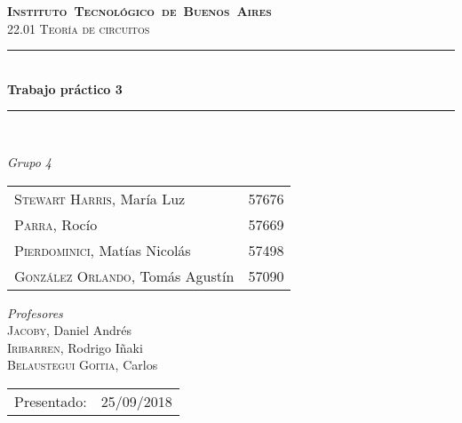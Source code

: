 \begin{titlepage}
\newcommand{\HRule}{\rule{\linewidth}{0.5mm}}
\center
\mbox{\textsc{\LARGE \bfseries {Instituto Tecnol\'ogico de Buenos Aires}}}\\[1.5cm]
\textsc{\Large 22.01 Teor\'ia de circuitos}\\[0.5cm]


\HRule \\[0.6cm]
{ \Huge \bfseries Trabajo pr\'actico 3}\\[0.4cm] %
\HRule \\[1.5cm]


{\large

\emph{Grupo 4}\\
\vspace{3px}

\begin{tabular}{lr} 	
\textsc{Stewart Harris}, Mar\'ia Luz  & 57676 \\ 	
\textsc{Parra}, Roc\'io  & 57669 \\ 	
\textsc{Pierdominici}, Mat\'ias Nicol\'as & 57498 \\     
\textsc{Gonz\'alez Orlando}, Tom\'as Agust\'in  & 57090 
\end{tabular}

\vspace{20px}

\emph{Profesores}\\
\vspace{3px}
\textsc{Jacoby,} Daniel Andr\'es\\ 	
\textsc{Iribarren,} Rodrigo I\~naki\\
\textsc{Belaustegui Goitia,} Carlos \\

\vspace{100px}

\begin{tabular}{ll}

Presentado: & 25/09/2018\\

\end{tabular}

}

\vfill

\end{titlepage}